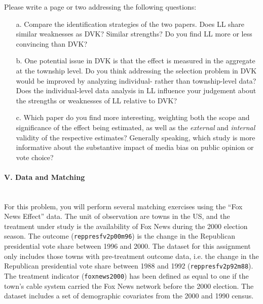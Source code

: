 \documentclass{article}
\begin{document}
Please write a page or two addressing the following questions:


   \begin{itemize}
   \item[a.]  Compare the identification strategies of the two papers.
     Does LL share similar weaknesses as DVK? Similar strengths?
Do you find LL more or less convincing than DVK?    

   \item[b.] One potential issue in DVK is that the effect is measured
     in the aggregate at the township level. Do you think addressing
     the selection problem in DVK would be improved by analyzing
     individual- rather than township-level data?  Does the
     individual-level data analysis in LL influence your judgement
     about the strengths or weaknesses of LL relative to DVK?
   \item[c.]  Which paper do you find more
     interesting, weighting both the scope and significance of the
     effect being estimated, as well as the {\em external} and {\em internal} validity
     of the respective estimates?  Generally speaking, which study is
     more informative about the substantive impact of media bias on 
public opinion or vote choice?  

\end{itemize}




\paragraph{\Large V. Data and Matching \\ \\}

For this problem, you will perform several matching exercises using
the ``Fox News Effect'' data.  The unit of observation are towns in
the US, and the treatment under study is the availability of Fox News
during the 2000 election season. The outcome (\texttt{reppresfv2p00m96}) is the
change in the Republican presidential vote share between 1996 and
2000. The dataset for this assignment only includes those towns with
pre-treatment outcome data, i.e. the change in the Republican
presidential vote share between 1988 and 1992 (\texttt{reppresfv2p92m88}). The
treatment indicator (\texttt{foxnews2000}) has been defined as equal to one if
the town’s cable system carried the Fox News network before the 2000
election. The dataset includes a set of demographic covariates from
the 2000 and 1990 census.
\vspace{1em}
\end{document}
